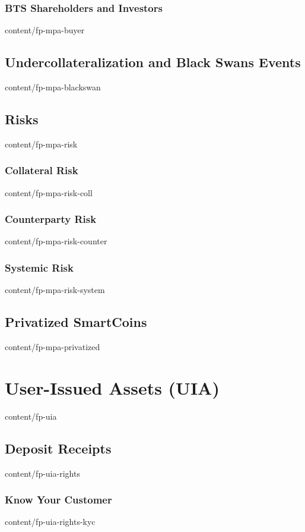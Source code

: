 \documentclass{btswhitepaper}
\begin{document}
\subsubsection  { BTS Shareholders and Investors                   }  { content/fp-mpa-buyer           } 
\subsection     { Undercollateralization and Black Swans Events    }  { content/fp-mpa-blackswan       } 
\subsection     { Risks                                            }  { content/fp-mpa-risk            } 
\subsubsection  { Collateral Risk                                  }  { content/fp-mpa-risk-coll       } 
\subsubsection  { Counterparty Risk                                }  { content/fp-mpa-risk-counter    } 
\subsubsection  { Systemic Risk                                    }  { content/fp-mpa-risk-system     } 
\subsection     { Privatized SmartCoins                            }  { content/fp-mpa-privatized      } 

\section        { User-Issued Assets (UIA)                         }  { content/fp-uia                 } 
\subsection     { Deposit Receipts                                 }  { content/fp-uia-rights          } 
\subsubsection  { Know Your Customer                               }  { content/fp-uia-rights-kyc      } 
\end{document}

